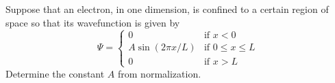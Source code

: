 Suppose that an electron, in one dimension, is confined to a certain region
of space so that its wavefunction is given by
\begin{equation*}
  \Psi = 
  \begin{cases}
    0 & \text{if } x<0 \\
    A \sin(2\pi x/L) & \text{if } 0\le x\le L \\
    0 & \text{if } x>L 
  \end{cases}
\end{equation*}
Determine the constant $A$ from normalization.\answercheck

